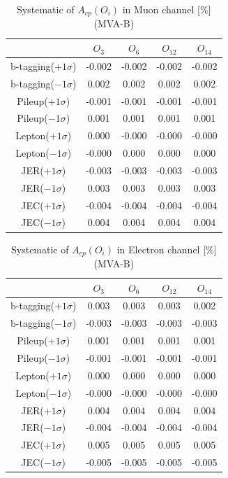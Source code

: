 		\begin{center}
		\setlength{\tabcolsep}{12pt}
		\begin{longtable}{ | c | c c c c | }
		\caption{Systematic of $A_{cp}(O_i)$ in Muon channel [\%] (MVA-B)}\\
		\hline
		 [\%] & $O_3$ & $O_6$ & $O_{12}$ & $O_{14}$ \\
		\hline
		b-tagging($+1\sigma$) & -0.002 & -0.002 & -0.002 & -0.002 \\
		b-tagging($-1\sigma$) & 0.002 & 0.002 & 0.002 & 0.002 \\
		\hline
		Pileup($+1\sigma$) & -0.001 & -0.001 & -0.001 & -0.001 \\
		Pileup($-1\sigma$) & 0.001 & 0.001 & 0.001 & 0.001 \\
		\hline
		Lepton($+1\sigma$) & 0.000 & -0.000 & -0.000 & -0.000 \\
		Lepton($-1\sigma$) & -0.000 & 0.000 & 0.000 & 0.000 \\
		\hline
		JER($+1\sigma$) & -0.003 & -0.003 & -0.003 & -0.003 \\
		JER($-1\sigma$) & 0.003 & 0.003 & 0.003 & 0.003 \\
		\hline
		JEC($+1\sigma$) & -0.004 & -0.004 & -0.004 & -0.004 \\
		JEC($-1\sigma$) & 0.004 & 0.004 & 0.004 & 0.004 \\
		\hline
		\end{longtable}
		\end{center}

		\begin{center}
		\setlength{\tabcolsep}{12pt}
		\begin{longtable}{ | c | c c c c | }
		\caption{Systematic of $A_{cp}(O_i)$ in Electron channel [\%] (MVA-B)}\\
		\hline
		 [\%] & $O_3$ & $O_6$ & $O_{12}$ & $O_{14}$ \\
		\hline
		b-tagging($+1\sigma$) & 0.003 & 0.003 & 0.003 & 0.002 \\
		b-tagging($-1\sigma$) & -0.003 & -0.003 & -0.003 & -0.003 \\
		\hline
		Pileup($+1\sigma$) & 0.001 & 0.001 & 0.001 & 0.001 \\
		Pileup($-1\sigma$) & -0.001 & -0.001 & -0.001 & -0.001 \\
		\hline
		Lepton($+1\sigma$) & 0.000 & 0.000 & 0.000 & 0.000 \\
		Lepton($-1\sigma$) & -0.000 & -0.000 & -0.000 & -0.000 \\
		\hline
		JER($+1\sigma$) & 0.004 & 0.004 & 0.004 & 0.004 \\
		JER($-1\sigma$) & -0.004 & -0.004 & -0.004 & -0.004 \\
		\hline
		JEC($+1\sigma$) & 0.005 & 0.005 & 0.005 & 0.005 \\
		JEC($-1\sigma$) & -0.005 & -0.005 & -0.005 & -0.005 \\
		\hline
		\end{longtable}
		\end{center}


